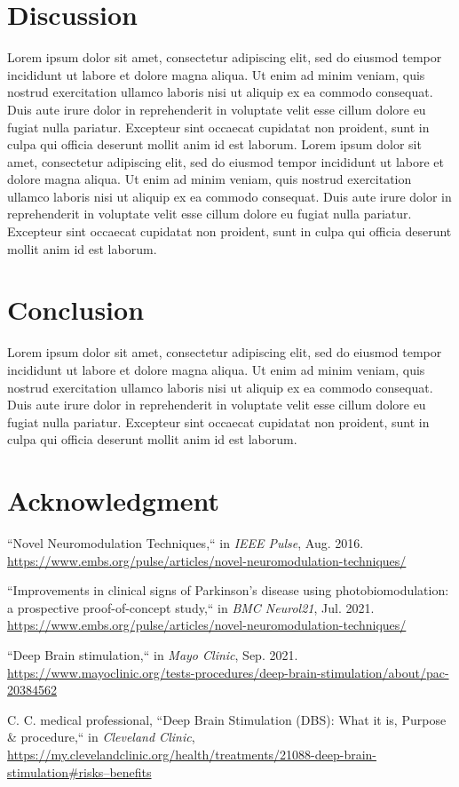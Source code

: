 \documentclass[journal,twoside,web]{ieeecolor}
\begin{document}
\section{Discussion}
\label{sec:next steps}
Lorem ipsum dolor sit amet, consectetur adipiscing elit, sed do eiusmod tempor incididunt ut labore et dolore magna aliqua. Ut enim ad minim veniam, 
quis nostrud exercitation ullamco laboris nisi ut aliquip ex ea commodo consequat. Duis aute irure dolor in reprehenderit in voluptate velit esse 
cillum dolore eu fugiat nulla pariatur. Excepteur sint occaecat cupidatat non proident, sunt in culpa qui officia deserunt mollit anim id est laborum.
Lorem ipsum dolor sit amet, consectetur adipiscing elit, sed do eiusmod tempor incididunt ut labore et dolore magna aliqua. Ut enim ad minim veniam, 
quis nostrud exercitation ullamco laboris nisi ut aliquip ex ea commodo consequat. Duis aute irure dolor in reprehenderit in voluptate velit esse cillum 
dolore eu fugiat nulla pariatur. Excepteur sint occaecat cupidatat non proident, sunt in culpa qui officia deserunt mollit anim id est laborum.

\section{Conclusion}
\label{sec:conclusion}
Lorem ipsum dolor sit amet, consectetur adipiscing elit, sed do eiusmod tempor incididunt ut labore et dolore magna aliqua. Ut enim ad minim veniam, 
quis nostrud exercitation ullamco laboris nisi ut aliquip ex ea commodo consequat. Duis aute irure dolor in reprehenderit in voluptate velit esse 
cillum dolore eu fugiat nulla pariatur. Excepteur sint occaecat cupidatat non proident, sunt in culpa qui officia deserunt mollit anim id est laborum.

\section*{Acknowledgment}

\begin{thebibliography}{00}

 ``Novel Neuromodulation Techniques,`` in \emph{IEEE Pulse}, Aug. 2016. 
\underline{https://www.embs.org/pulse/articles/novel-neuromodulation-techniques/} 

 ``Improvements in clinical signs of Parkinson's disease using photobiomodulation: a prospective proof-of-concept study,`` in \emph{BMC Neurol21}, Jul. 2021. 
\underline{https://www.embs.org/pulse/articles/novel-neuromodulation-techniques/} 

 ``Deep Brain stimulation,`` in \emph{Mayo Clinic}, Sep. 2021. 
\underline{https://www.mayoclinic.org/tests-procedures/deep-brain-stimulation/about/pac-20384562}

 C. C. medical professional, ``Deep Brain Stimulation (DBS): What it is, Purpose \& procedure,`` in \emph{Cleveland Clinic}, 
\underline{https://my.clevelandclinic.org/health/treatments/21088-deep-brain-stimulation\#risks--benefits}

\end{thebibliography}
\end{document}
